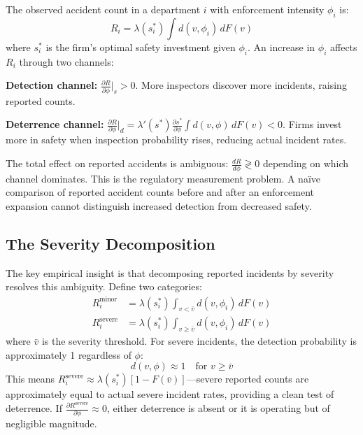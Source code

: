 \documentclass[12pt]{article}
\begin{document}
The observed accident count in a department $i$ with enforcement intensity $\phi_i$ is:
\begin{equation}
R_i = \lambda(s_i^*) \int d(v, \phi_i) \, dF(v)
\label{eq:reported}
\end{equation}
where $s_i^*$ is the firm's optimal safety investment given $\phi_i$. An increase in $\phi_i$ affects $R_i$ through two channels:

\textbf{Detection channel:} $\frac{\partial R}{\partial \phi}\bigg|_s > 0$. More inspectors discover more incidents, raising reported counts.

\textbf{Deterrence channel:} $\frac{\partial R}{\partial \phi}\bigg|_d = \lambda'(s^*) \frac{\partial s^*}{\partial \phi} \int d(v, \phi) \, dF(v) < 0$. Firms invest more in safety when inspection probability rises, reducing actual incident rates.

The total effect on reported accidents is ambiguous: $\frac{dR}{d\phi} \gtrless 0$ depending on which channel dominates. This is the regulatory measurement problem. A na\"ive comparison of reported accident counts before and after an enforcement expansion cannot distinguish increased detection from decreased safety.

\subsection{The Severity Decomposition}

The key empirical insight is that decomposing reported incidents by severity resolves this ambiguity. Define two categories:
\begin{align}
R_i^{\text{minor}} &= \lambda(s_i^*) \int_{v < \bar{v}} d(v, \phi_i) \, dF(v) \\
R_i^{\text{severe}} &= \lambda(s_i^*) \int_{v \geq \bar{v}} d(v, \phi_i) \, dF(v)
\end{align}
where $\bar{v}$ is the severity threshold. For severe incidents, the detection probability is approximately 1 regardless of $\phi$:
\begin{equation}
d(v, \phi) \approx 1 \quad \text{for } v \geq \bar{v}
\end{equation}
This means $R_i^{\text{severe}} \approx \lambda(s_i^*) [1 - F(\bar{v})]$---severe reported counts are approximately equal to actual severe incident rates, providing a clean test of deterrence. If $\frac{\partial R^{\text{severe}}}{\partial \phi} \approx 0$, either deterrence is absent or it is operating but of negligible magnitude.
\end{document}
